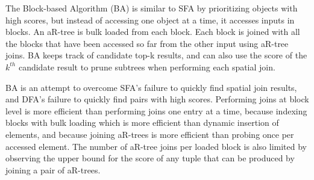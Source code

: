 The Block-based Algorithm (BA) is similar to SFA by prioritizing objects with high scores, but instead of accessing one object at a time, it accesses inputs in blocks. An aR-tree is bulk loaded from each block. Each block is joined with all the blocks that have been accessed so far from the other input using aR-tree joins. BA keeps track of candidate top-k results, and can also use the score of the \(k^{th}\) candidate result to prune subtrees when performing each spatial join.

BA is an attempt to overcome SFA's failure to quickly find spatial join results, and DFA's failure to quickly find pairs with high scores. Performing joins at block level is more efficient than performing joins one entry at a time, because indexing blocks with bulk loading which is more efficient than dynamic insertion of elements, and because joining aR-trees is more efficient than probing once per accessed element. The number of aR-tree joins per loaded block is also limited by observing the upper bound for the score of any tuple that can be produced by joining a pair of aR-trees.
